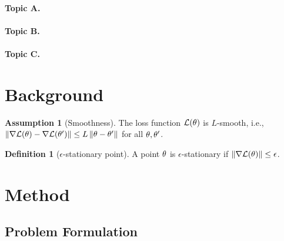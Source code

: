 \documentclass[10pt]{article} %
\theoremstyle{definition}
\newtheorem{definition}[theorem]{Definition}
\newtheorem{assumption}[theorem]{Assumption}
\theoremstyle{remark}
\begin{document}

\paragraph{Topic A.}

\paragraph{Topic B.}

\paragraph{Topic C.}

\section{Background}
\label{sec:background}


\begin{assumption}[Smoothness]
    \label{asm:smooth}
    The loss function $\mathcal{L}(\theta)$ is $L$-smooth, i.e.,
    $\left\lVert \nabla \mathcal{L}(\theta) - \nabla \mathcal{L}(\theta') \right\rVert \leq L \left\lVert \theta - \theta' \right\rVert$
    for all $\theta, \theta'$.
\end{assumption}

\begin{definition}[$\epsilon$-stationary point]
    \label{def:stationary}
    A point $\theta$ is $\epsilon$-stationary if $\left\lVert \nabla \mathcal{L}(\theta) \right\rVert \leq \epsilon$.
\end{definition}

\section{Method}
\label{sec:method}


\subsection{Problem Formulation}
\label{sec:formulation}
\end{document}
